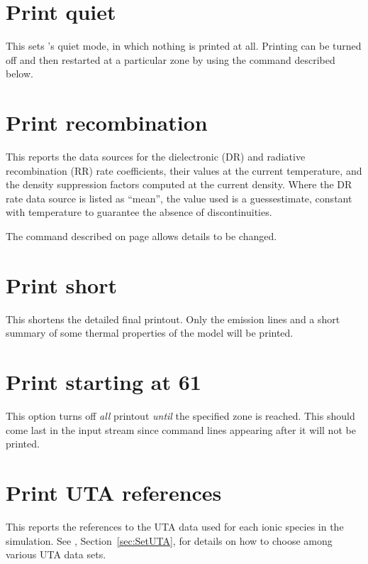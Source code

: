 \section{Print quiet}

This sets \Cloudy's quiet mode, in which nothing is printed at all.
Printing can be turned off and then restarted at a particular zone by using
the  command described below.


\section{Print recombination}
\label{sec:PrintRecombination}

\par
This reports the data sources for the dielectronic (DR) and
radiative recombination (RR) rate coefficients, their values
at the current temperature, and the density suppression
factors computed at the current density.
Where the DR rate data source is listed as ``mean'',
the value used is a guessestimate, constant with
temperature to guarantee the absence of discontinuities.

\par
The  command described on page
\pageref{sec:SetRecombination} allows details to be changed.


\section{Print short}

This shortens the detailed final printout.
Only the emission lines and
a short summary of some thermal properties of the model will be printed.

\section{Print starting at 61}

This option turns off \emph{all} printout \emph{until} the specified zone is reached.
This should come last in the input stream since command lines appearing
after it will not be printed.

\section{Print UTA references}
\label{sec:PrintUTAReferences}

This reports the references to the UTA data used for each ionic
species in the simulation.
See , Section~\ref{sec:SetUTA}, for details
on how to choose among various UTA data sets.

